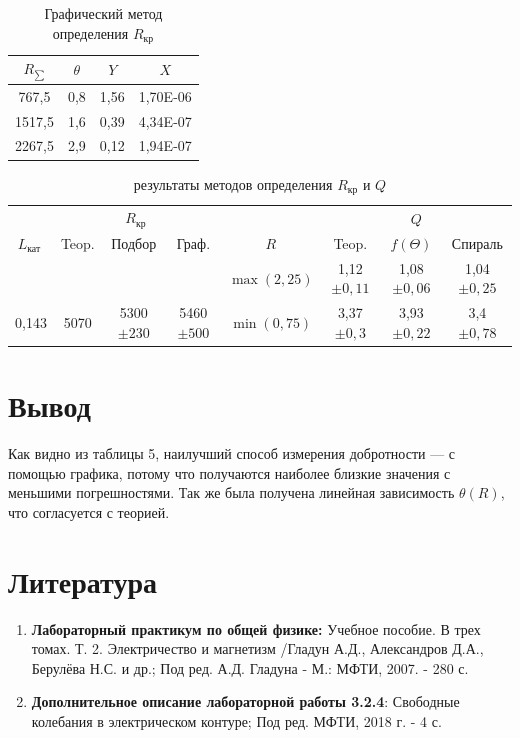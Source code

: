 \documentclass[a4paper, 12pt]{article}%
\begin{document}
\begin{table}[h!]
\begin{center}
\begin{tabular}{|c|c|c|c|}
\hline
\textbf{$R_{\sum}$} & \textbf{$\theta$} & \textbf{$Y$} & \textbf{$X$} \\ \hline
767,5                 & 0,8      & 1,56     & 1,70E-06 \\ \hline
1517,5                & 1,6      & 0,39     & 4,34E-07 \\ \hline
2267,5                & 2,9      & 0,12     & 1,94E-07 \\ \hline
\end{tabular}
\caption{Графический метод определения $R_{\text{кр}}$}
\end{center}
\end{table}

\newpage 

\begin{table}[h!]
\begin{tabular}{|c||c|c|c||c|c|c|c|}
\hline \multicolumn{1}{|l||}{} & \multicolumn{3}{c||}{$R_{\text {кр }}$}  &  & \multicolumn{3}{|c|}{$Q$} \\
\cline { 2 - 4 } \cline { 6 - 8 }$L_{\text {кат }}$ & Teop. & Подбор & Граф. & $R$ & Teop. & $f(\Theta)$ & Спираль \\
\hline \hline & & & & $\max(2,25)$  & 1,12 $\pm 0,11$ & 1,08 $\pm 0,06$ & 1,04 $\pm 0,25$\\
0,143 & 5070 & 5300 $\pm 230$ & 5460 $\pm 500$ & $\min(0,75)$ & 3,37 $\pm 0,3$ & 3,93 $\pm 0,22$ & 3,4 $\pm 0,78$\\
\hline
\end{tabular}
\caption{результаты методов определения $R_{\text{кр}}$ и $Q$}
\end{table}

\newpage

\section{Вывод}

Как видно из таблицы 5, наилучший способ измерения добротности --- с помощью графика, потому что получаются наиболее близкие значения с меньшими погрешностями. Так же была получена линейная зависимость $\theta(R)$, что согласуется с теорией.

\section{Литература}

\begin{enumerate}
\item \textbf{Лабораторный практикум по общей физике:} Учебное пособие. В трех томах. Т. 2. Электричество и магнетизм /Гладун А.Д., Александров Д.А., Берулёва Н.С. и др.; Под ред. А.Д. Гладуна - М.: МФТИ, 2007. - 280 с.
\item \textbf{Дополнительное описание лабораторной работы 3.2.4}: Свободные колебания в электрическом контуре; Под ред. МФТИ, 2018 г. - 4 с.
\end{enumerate}

					
\end{document}
